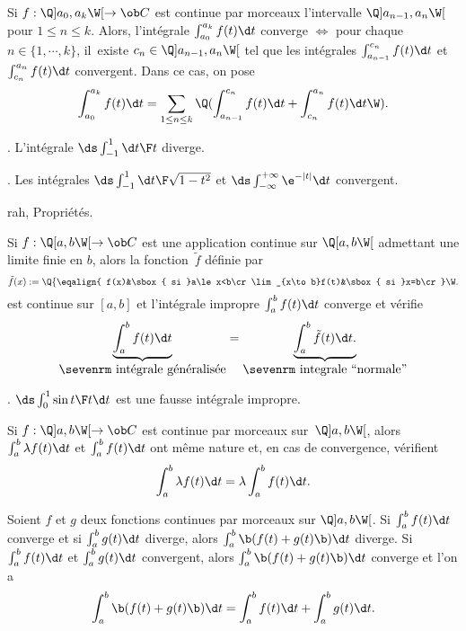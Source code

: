 Si $f:\Q]a_0,a_k\W[\to\ob C$ est continue par morceaux l'intervalle $\Q]a_{n-1},a_n\W[$ pour $1\le n\le k$. Alors, 
l'int\'egrale $\int_{a_0}^{a_k}f(t)\d t$ converge $\Longleftrightarrow$ pour chaque $n\in\{1,\cdots,k\}$, il~existe $c_n\in\Q]a_{n-1},a_n\W[$ tel que 
les int\'egrales $\int_{a_{n-1}}^{c_n}f(t)\d t$ et $\int_{c_n}^{a_n}f(t)\d t$ convergent. Dans ce cas, on pose
$$
\int_{a_0}^{a_k}f(t)\d t=\sum_{1\le n\le k}\Q(\int_{a_{n-1}}^{c_n}f(t)\d t+\int_{c_n}^{a_n}f(t)\d t\W). 
$$


\Exemple. L'int\'egrale $\ds\int_{-1}^1{\d t\F t}$ diverge.
\bigskip

\Exemple. Les int\'egrales $\ds \int_{-1}^1{\d t\F\sqrt{1-t^2}}$ et $\ds\int_{-\infty}^{+\infty}\e^{-|t|}\d t$ 
convergent. 
\bigskip


\Subsection rah, Propri\'et\'es.


\Propriete [$(a,b)\in\ob R^2$, $a\le b$] 
Si $f:\Q[a,b\W[\to\ob C$ est une application continue sur $\Q[a,b\W[$ admettant une limite finie en $b$, 
alors la fonction~$\tilde f$ d\'efinie par 
$$
\tilde f(x):=\Q\{
\eqalign{
f(x)&\sbox{ si }a\le x<b\cr 
\lim_{x\to b}f(t)&\sbox{ si }x=b\cr}\W.
$$
est continue sur $[a,b]$ et l'int\'egrale impropre $\int_a^bf(t)\d t$ converge et v\'erifie 
$$
\underbrace{\int_a^bf(t)\d t}_{\mbox{\sevenrm int\'egrale g\'en\'eralis\'ee}}
=\underbrace{\int_a^b\tilde f(t)\d t.}_
{\mbox{\sevenrm integrale ``normale''}}
$$


\Exemple. $\ds \int_0^1{\sin t\F t}\d t$ est une fausse int\'egrale impropre. 
\bigskip


Si $f:\Q]a,b\W[\to\ob C$ est continue par morceaux sur~$\Q]a,b\W[$, alors $\int_a^b \lambda f(t)\d t$ et $\int_a^b f(t)\d t$ ont m\^eme nature et, 
en cas de convergence, v\'erifient 
$$
\int_a^b \lambda f(t)\d t=\lambda \int_a^b f(t)\d t. 
$$


\Propriete [$(a,b)\in\overline{\ob R}^2$] 
Soient $f$ et $g$ deux fonctions continues par morceaux sur $\Q]a,b\W[$. \pn
Si $\int_a^bf(t)\d t$ converge et si $\int_a^bg(t)\d t$ diverge, alors $\int_a^b\b(f(t)+g(t)\b)\d t$ diverge. \medskip\noindent
Si $\int_a^bf(t)\d t$ et $\int_a^bg(t)\d t$ convergent, alors $\int_a^b\b(f(t)+g(t)\b)\d t$ converge et l'on a 
\Equation [\bf addition]
$$
\int_a^b\b(f(t)+g(t)\b)\d t=\int_a^bf(t)\d t+\int_a^bg(t)\d t. 
$$

